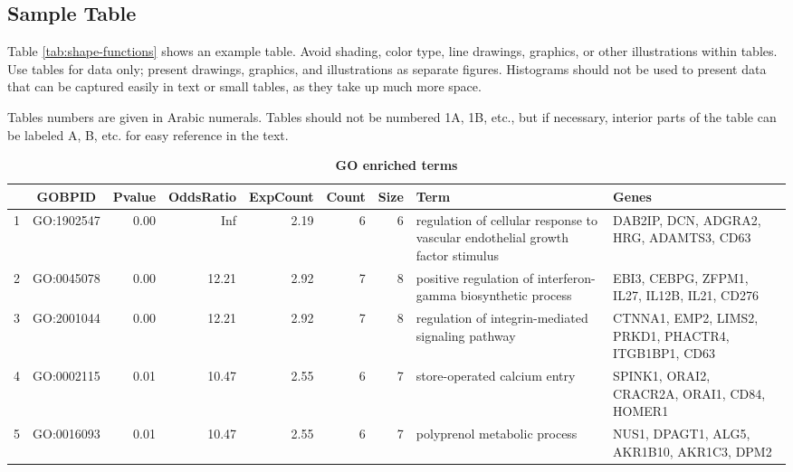 \documentclass[9pt,twocolumn,twoside]{gsajnl}
\begin{document}
\subsection*{Sample Table}

Table \ref{tab:shape-functions} shows an example table. Avoid shading, color type, line drawings, graphics, or other illustrations within tables. Use tables for data only; present drawings, graphics, and illustrations as separate figures. Histograms should not be used to present data that can be captured easily in text or small tables, as they take up much more space.  

Tables numbers are given in Arabic numerals. Tables should not be numbered 1A, 1B, etc., but if necessary, interior parts of the table can be labeled A, B, etc. for easy reference in the text.  

\begin{table*}[htbp]
\centering
\caption{\bf GO enriched terms}
\begin{tableminipage}{\textwidth}
 \begin{tabular}{l|c|r|r|r|r|r|p{3cm}|p{3cm}|}
   \hline
  & GOBPID & Pvalue & OddsRatio & ExpCount & Count & Size & Term & Genes \\ 
   \hline
 1 & GO:1902547 & 0.00 & Inf & 2.19 &   6 &   6 & regulation of cellular response to vascular endothelial growth factor stimulus & DAB2IP, DCN, ADGRA2, HRG, ADAMTS3, CD63 \\ 
   2 & GO:0045078 & 0.00 & 12.21 & 2.92 &   7 &   8 & positive regulation of interferon-gamma biosynthetic process & EBI3, CEBPG, ZFPM1, IL27, IL12B, IL21, CD276 \\ 
   3 & GO:2001044 & 0.00 & 12.21 & 2.92 &   7 &   8 & regulation of integrin-mediated signaling pathway & CTNNA1, EMP2, LIMS2, PRKD1, PHACTR4, ITGB1BP1, CD63 \\ 
   4 & GO:0002115 & 0.01 & 10.47 & 2.55 &   6 &   7 & store-operated calcium entry & SPINK1, ORAI2, CRACR2A, ORAI1, CD84, HOMER1 \\ 
   5 & GO:0016093 & 0.01 & 10.47 & 2.55 &   6 &   7 & polyprenol metabolic process & NUS1, DPAGT1, ALG5, AKR1B10, AKR1C3, DPM2 \\ 
    \hline
 \end{tabular}
 \label{tab:GOenrichment}
\end{tableminipage}
\end{table*}
\end{document}
